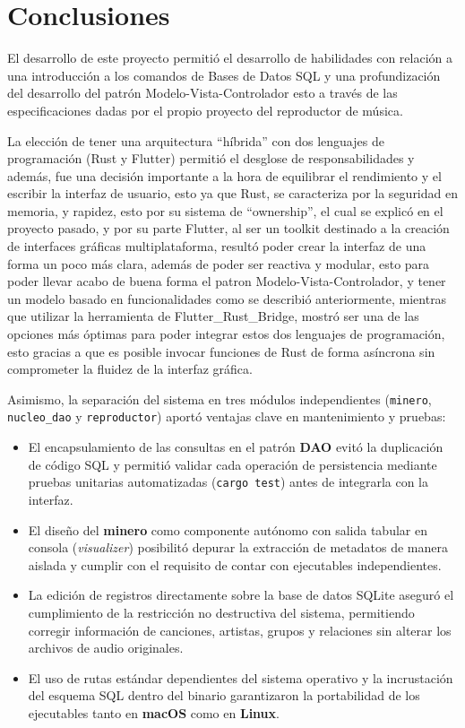 \section{Conclusiones}

El desarrollo de este proyecto permitió el desarrollo de habilidades con relación a una introducción a los comandos de Bases de Datos SQL y una profundización del desarrollo del patrón Modelo-Vista-Controlador esto a través de las especificaciones dadas por el propio proyecto del reproductor de música.

La elección de tener una arquitectura ``híbrida'' con dos lenguajes de programación (Rust y Flutter) permitió el desglose de responsabilidades y además, fue una decisión importante a la hora de equilibrar el rendimiento y el escribir la interfaz de usuario, esto ya que Rust, se caracteriza por la seguridad en memoria, y rapidez, esto por su sistema de ``ownership'', el cual se explicó en el proyecto pasado, y por su parte Flutter, al ser un toolkit destinado a la creación de interfaces gráficas multiplataforma, resultó poder crear la interfaz de una forma un poco más clara, además de poder ser reactiva y modular, esto para poder llevar acabo de buena forma el patron Modelo-Vista-Controlador, y tener un modelo basado en funcionalidades como se describió anteriormente, mientras que utilizar la herramienta de Flutter\_Rust\_Bridge, mostró ser una de las opciones más óptimas para poder integrar estos dos lenguajes de programación, esto gracias a que es posible invocar funciones de Rust de forma asíncrona sin comprometer la fluidez de la interfaz gráfica. 

Asimismo, la separación del sistema en tres módulos independientes (\texttt{minero}, \texttt{nucleo\_dao} y \texttt{reproductor}) aportó ventajas clave en mantenimiento y pruebas:
\begin{itemize}
    \item El encapsulamiento de las consultas en el patrón \textbf{DAO} evitó la duplicación de código SQL y permitió validar cada operación de persistencia mediante pruebas unitarias automatizadas (\texttt{cargo test}) antes de integrarla con la interfaz.
    \item El diseño del \textbf{minero} como componente autónomo con salida tabular en consola (\textit{visualizer}) posibilitó depurar la extracción de metadatos de manera aislada y cumplir con el requisito de contar con ejecutables independientes.
    \item La edición de registros directamente sobre la base de datos SQLite aseguró el cumplimiento de la restricción no destructiva del sistema, permitiendo corregir información de canciones, artistas, grupos y relaciones sin alterar los archivos de audio originales.
    \item El uso de rutas estándar dependientes del sistema operativo y la incrustación del esquema SQL dentro del binario garantizaron la portabilidad de los ejecutables tanto en \textbf{macOS} como en \textbf{Linux}.
\end{itemize}

